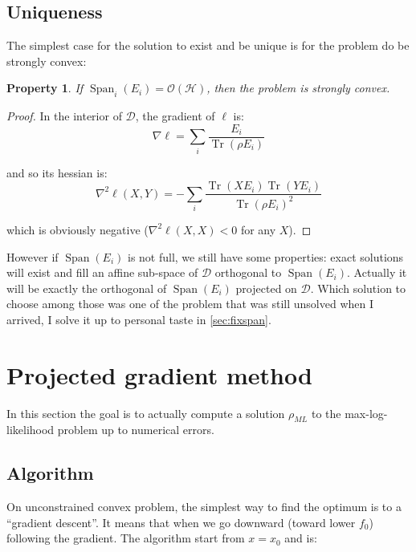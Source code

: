 \documentclass[10pt,a4paper]{report}
\theoremstyle{plain}
\newtheorem{prop}[thm]{Property}
\theoremstyle{definition}
\theoremstyle{remark}
\DeclareMathOperator{\Tr}{Tr}
\DeclareMathOperator{\Span}{Span}
\newcommand{\ml}{_{M\!L}}
\begin{document}
\subsection{Uniqueness}\label{ssec:uniq}

The simplest case for the solution to exist and be unique is for the problem do
be strongly convex:

\begin{prop}
  If $\Span_i(E_i) = \mathcal{O}(\mathcal{H})$, then the problem is strongly convex.
\end{prop}

\begin{proof} In the interior of $\mathcal{D}$, the gradient of $\ell$ is:
\begin{equation}
\nabla \ell = \sum_i \frac{E_i}{\Tr(\rho E_i)}
\end{equation}

and so its hessian is:
\begin{equation}
\nabla^2 \ell(X,Y) = - \sum_i \frac{\Tr(XE_i)\Tr(YE_i)}{\Tr(\rho E_i)^2}
\end{equation}

which is obviously negative ($\nabla^2 \ell(X,X) < 0$ for any $X$).
\end{proof}

However if $\Span(E_i)$ is not full, we still have some properties: exact
solutions will exist and fill an affine sub-space of $\mathcal{D}$ orthogonal to
$\Span(E_i)$. Actually it will be exactly the orthogonal of $\Span(E_i)$
projected on $\mathcal{D}$. Which solution to choose among those was one of the problem that
was still unsolved when I arrived, I solve it up to personal taste in \cref{sec:fixspan}.








\section{Projected gradient method}\label{sec:projgrad}

In this section the goal is to actually compute a solution $\rho\ml$ to the
max-log-likelihood problem up to
numerical errors.

\subsection{Algorithm}

On unconstrained convex problem, the simplest way to find the optimum is to a
``gradient descent''. It means that when we go downward (toward lower $f_0$)
following the gradient. The algorithm start from $x = x_0$ and is:
\end{document}
